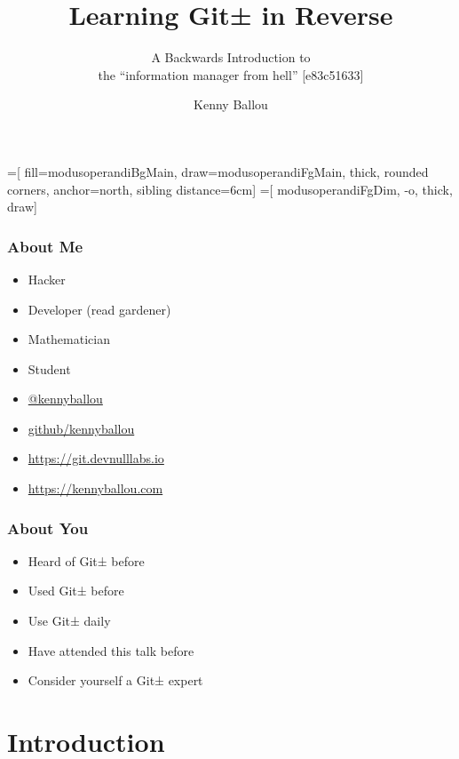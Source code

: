 \documentclass[]{beamer}
\title{Learning Git± in Reverse}
\subtitle{A Backwards Introduction to \\{} the ``information manager from
hell'' [e83c51633]}
\author[Ballou]{Kenny Ballou}
\institute[/dev/null]{/dev/null > labs}
\begin{document}
=[%
    fill=modusoperandiBgMain,
    draw=modusoperandiFgMain,
    thick,
    rounded corners,
    anchor=north,
    sibling distance=6cm]
=[%
    modusoperandiFgDim,
    -o,
    thick,
    draw]


\begin{frame}[label=titleslide]
\titlepage{}
\end{frame}

\begin{frame}
\tableofcontents[subsectionstyle=hide]
\end{frame}

\begin{frame}
\frametitle{About Me}
\begin{itemize}
\item{Hacker}
\item{Developer (read gardener)}
\item{Mathematician}
\item{Student}
\item{\href{https://twitter.com/kennyballou}{@kennyballou}}
\item{\href{https://github.com}{github/kennyballou}}
\item{\url{https://git.devnulllabs.io}}
\item{\url{https://kennyballou.com}}
\end{itemize}

\end{frame}

\begin{frame}
  \frametitle{About You}
  \begin{itemize}
  \item<2->{Heard of Git± before}
  \item<3->{Used Git± before}
  \item<4->{Use Git± daily}
  \item<5->{Have attended this talk before}
  \item<5->{Consider yourself a Git± expert}
  \end{itemize}
\end{frame}

\section{Introduction}
\end{document}

